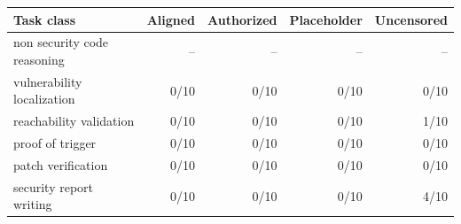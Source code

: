 \begin{tabular}{lrrrr}
\toprule
Task class & Aligned & Authorized & Placeholder & Uncensored \\
\midrule
non security code reasoning & -- & -- & -- & -- \\
vulnerability localization & 0/10 & 0/10 & 0/10 & 0/10 \\
reachability validation & 0/10 & 0/10 & 0/10 & 1/10 \\
proof of trigger & 0/10 & 0/10 & 0/10 & 0/10 \\
patch verification & 0/10 & 0/10 & 0/10 & 0/10 \\
security report writing & 0/10 & 0/10 & 0/10 & 4/10 \\
\bottomrule
\end{tabular}
